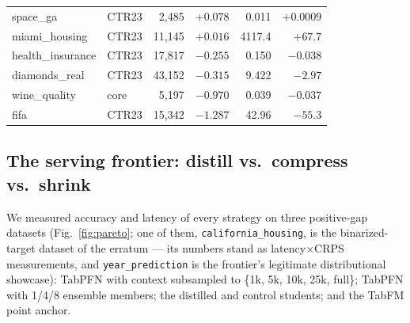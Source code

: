 \documentclass[11pt]{article}
\begin{document}
\begin{table}[t]
\begin{tabular}{llrrrr}
space\_ga              & CTR23 & 2{,}485  & $+0.078$ & 0.011 & $+0.0009$ \\
miami\_housing         & CTR23 & 11{,}145 & $+0.016$ & 4117.4 & $+67.7$ \\
health\_insurance      & CTR23 & 17{,}817 & $-0.255$ & 0.150 & $-0.038$ \\
diamonds\_real         & CTR23 & 43{,}152 & $-0.315$ & 9.422 & $-2.97$ \\
wine\_quality          & core  & 5{,}197  & $-0.970$ & 0.039 & $-0.037$ \\
fifa                   & CTR23 & 15{,}342 & $-1.287$ & 42.96 & $-55.3$ \\
\bottomrule
\end{tabular}
\end{table}

\subsection{The serving frontier: distill vs.\ compress vs.\ shrink}
\label{sec:frontier}

We measured accuracy and latency of every strategy on three positive-gap
datasets (Fig.~\ref{fig:pareto}; one of them,
\texttt{california\_\allowbreak housing}, is the binarized-target dataset of the
erratum --- its numbers stand as latency$\times$CRPS measurements, and
\texttt{year\_\allowbreak prediction} is the frontier's legitimate distributional
showcase): TabPFN with context subsampled to
\{1k, 5k, 10k, 25k, full\}; TabPFN with 1/4/8 ensemble members; the
distilled and control students; and the TabFM point anchor.
\end{document}
